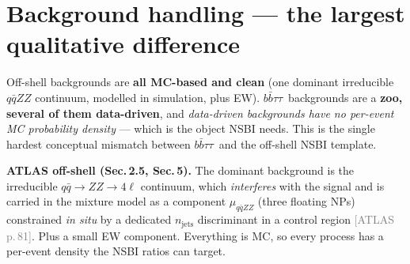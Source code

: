 \documentclass[11pt]{article}
\newcommand{\bbtt}{\ensuremath{b\bar b\tau\tau}}
\newcommand{\pA}[1]{\textcolor{gray}{\small[ATLAS p.\,#1]}}
\begin{document}
\section{Background handling --- the largest qualitative difference}
\begin{keybox}
Off-shell backgrounds are \textbf{all MC-based and clean} (one dominant irreducible $q\bar q ZZ$ continuum, modelled
in simulation, plus EW). \bbtt\ backgrounds are a \textbf{zoo, several of them data-driven}, and \emph{data-driven
backgrounds have no per-event MC probability density} --- which is the object NSBI needs. This is the single
hardest conceptual mismatch between \bbtt\ and the off-shell NSBI template.
\end{keybox}

\noindent\textbf{ATLAS off-shell (Sec.\,2.5, Sec.\,5).} The dominant background is the irreducible $q\bar q\to
ZZ\to4\ell$ continuum, which \emph{interferes} with the signal and is carried in the mixture model as a component
$\mu_{q\bar qZZ}$ (three floating NPs) constrained \emph{in situ} by a dedicated $n_{\text{jets}}$ discriminant in a
control region \pA{81}. Plus a small EW component. Everything is MC, so every process has a per-event density the
NSBI ratios can target.
\end{document}
